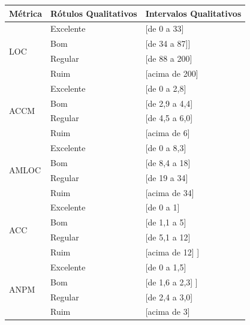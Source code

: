 	
\begin{longtable}{|l|l|l|}
		\hline
		
		\textbf{Métrica} & \textbf{Rótulos Qualitativos} &  \textbf{Intervalos Qualitativos}  \\ \hline


		 \multirow{4}{*}{LOC} 
		 & Excelente & [de 0 a 33]  \\
		 & Bom & [de 34 a 87]] \\
		 & Regular & [de 88 a 200]  \\
		 & Ruim & [acima de 200] \\ \hline

		 \multirow{4}{*}{ACCM} 
		 & Excelente & [de 0 a 2,8]  \\
		 & Bom & [de 2,9 a 4,4]  \\
		 & Regular & [de 4,5 a 6,0]  \\
		 & Ruim & [acima de 6]  \\ \hline


		 \multirow{4}{*}{AMLOC} 
		 & Excelente & [de 0 a 8,3]  \\
		 & Bom & [de 8,4 a 18]  \\
		 & Regular & [de 19 a 34]  \\
		 & Ruim & [acima de 34]  \\ \hline


		 \multirow{4}{*}{ACC} 
		 & Excelente & [de 0 a 1] \\
		 & Bom & [de 1,1 a 5]  \\
		 & Regular & [de 5,1 a 12] \\
		 & Ruim & [acima de 12] ] \\ \hline


		 \multirow{4}{*}{ANPM} 
		 & Excelente & [de 0 a 1,5] \\
		 & Bom & [de 1,6 a 2,3] ] \\
		 & Regular & [de 2,4 a 3,0]  \\
		 & Ruim & [acima de 3] \\ \hline


\end{longtable}
